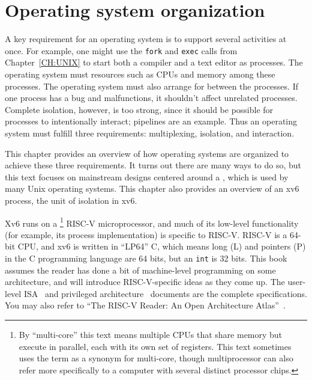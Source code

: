 
\chapter{Operating system organization}
\label{CH:FIRST}

A key requirement for an operating system is to support several activities at once.  For
example,
one might use the {\tt fork} and {\tt exec} calls from
Chapter~\ref{CH:UNIX}
to start both a compiler and a text editor as processes.
The operating system must 
resources such as CPUs and memory among these processes.
The operating system must also arrange for
between the processes.
If one process has a bug and malfunctions,
it shouldn't affect unrelated processes.
Complete isolation, however, is too strong, since it should be possible for
processes to intentionally interact; pipelines are an example.
Thus
an operating system must fulfill three requirements: multiplexing, isolation,
and interaction.

This chapter provides an overview of how operating systems are
organized to achieve these three requirements.  It turns out there are
many ways to do so, but this text focuses on mainstream designs
centered around a , which is used by many
Unix operating systems.  This chapter also provides an overview of an
xv6 process, the unit of isolation in xv6.

Xv6 runs on a \footnote{
By ``multi-core'' this text means multiple CPUs that share memory but execute
in parallel, each with its own set of registers.
This text sometimes uses the term
 as a synonym for multi-core,
though multiprocessor can also refer more specifically to a computer with
several distinct processor chips.} RISC-V microprocessor,
and much of its low-level
functionality (for example, its process implementation) is specific to
RISC-V.  RISC-V is a 64-bit CPU, and xv6 is written in ``LP64'' C,
which means long (L) and pointers (P) in the C programming language
are 64 bits, but an {\tt int} is 32 bits.  This book assumes the reader has done
a bit of machine-level programming on some architecture, and will
introduce RISC-V-specific ideas as they come up.
The user-level ISA~\cite{riscv:user} and privileged
architecture~\cite{riscv:priv} documents are the complete
specifications.
You may also refer to
``The RISC-V Reader: An Open Architecture
Atlas''~\cite{riscv}.

